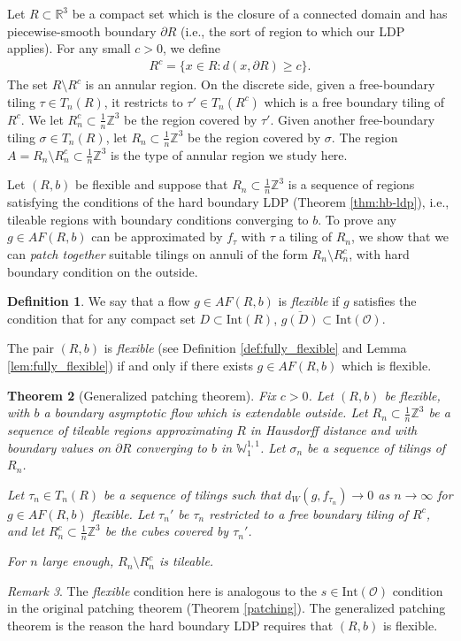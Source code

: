 \documentclass[11pt]{article}
\newtheorem{thm}{Theorem}[subsection]
\theoremstyle{remark}
\newtheorem{rem}[thm]{Remark}
\theoremstyle{definition}
\newtheorem{definition}[thm]{Definition}
\newcommand{\mc}[1]{\mathcal{#1}}
\newcommand{\m}[1]{\mathbb{#1}}
\begin{document}
Let $R\subset \m R^3$ be a compact set which is the closure of a connected domain and has piecewise-smooth boundary $\partial R$ (i.e., the sort of region to which our LDP applies). For any small $c>0$, we define 
\begin{align*}
    R^c = \{x\in R: d(x,\partial R)\geq c\}.
\end{align*}
The set $R\setminus R^c$ is an annular region. On the discrete side, given a free-boundary tiling $\tau\in T_n(R)$, it restricts to $\tau'\in T_n(R^c)$ which is a free boundary tiling of $R^c$. We let $R_n^c\subset \frac{1}{n} \m Z^3$ be the region covered by $\tau'$. Given another free-boundary tiling $\sigma\in T_n(R)$, let $R_n\subset \frac{1}{n}\m Z^3$ be the region covered by $\sigma$. The region $A= R_n\setminus R_n^c\subset \frac{1}{n} \m Z^3$ is the type of annular region we study here. 

Let $(R,b)$ be flexible and suppose that $R_n\subset \frac{1}{n} \m Z^3$ is a sequence of regions satisfying the conditions of the hard boundary LDP (Theorem \ref{thm:hb-ldp}), i.e., tileable regions with boundary conditions converging to $b$. To prove any $g\in AF(R,b)$ can be approximated by $f_\tau$ with $\tau$ a tiling of $R_n$, we show that we can \textit{patch together} suitable tilings on annuli of the form $R_n\setminus R_n^c$, with hard boundary condition on the outside.

\begin{definition}
    We say that a flow $g\in AF(R,b)$ is \textit{flexible} if $g$ satisfies the condition that for any compact set $D\subset \text{Int}(R)$, $\overline{g(D)}\subset \text{Int}(\mc O)$. 
\end{definition}
The pair $(R,b)$ is \textit{flexible} (see Definition \ref{def:fully_flexible} and Lemma \ref{lem:fully_flexible}) if and only if there exists $g\in AF(R,b)$ which is flexible. 

\begin{thm}[Generalized patching theorem]\label{thm:generalized_patching}
    Fix $c>0$. Let $(R,b)$ be flexible, with $b$ a boundary asymptotic flow which is extendable outside. Let $R_n\subset \frac{1}{n} \m Z^3$ be a sequence of tileable regions approximating $R$ in Hausdorff distance and with boundary values on $\partial R$ converging to $b$ in $\m W_1^{1,1}$. Let $\sigma_n$ be a sequence of tilings of $R_n$. 

    Let $\tau_n\in T_n(R)$ be a sequence of tilings such that $d_W(g,f_{\tau_n}) \to 0$ as $n\to \infty$ for $g\in AF(R,b)$ flexible. Let $\tau_n'$ be $\tau_n$ restricted to a free boundary tiling of $R^c$, and let $R_n^c\subset \frac{1}{n} \m Z^3$ be the cubes covered by $\tau_n'$. 
    
    For $n$ large enough, $R_n\setminus R_n^c$ is tileable. 
\end{thm}
\begin{rem}
   The \textit{flexible} condition here is analogous to the $s\in \text{Int}(\mc O)$ condition in the original patching theorem (Theorem \ref{patching}). The generalized patching theorem is the reason the hard boundary LDP requires that $(R,b)$ is flexible. 
\end{rem}
\end{document}
